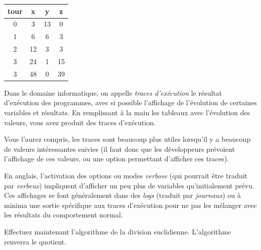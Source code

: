 \documentclass[11pt,a4paper]{article}
\begin{document}
\bigskip

    \begin{tabular}{|c|c|c|c|}
        \hline
        tour &  x &  y &  z  \\
        \hline
        0    &  3 & 13 &  0  \\
        1    &  6 &  6 &  3  \\
        2    & 12 &  3 &  3  \\
        3    & 24 &  1 & 15  \\
        3    & 48 &  0 & 39  \\
        \hline
    \end{tabular}

\bigskip


Dans le domaine informatique, on appelle \textit{traces d'exécution} le résultat d'exécution des programmes, avec si possible l'affichage de l'évolution de certaines variables et résultats.
En remplissant à la main les tableaux avec l'évolution des valeurs, vous avez produit des traces d'exécution.

Vous l'aurez compris, les traces sont beaucoup plus utiles lorsqu'il y a beaucoup de valeurs intéressantes suivies (il faut donc que les développeurs prévoient l'affichage de ces valeurs, ou une option permettant d'afficher ces traces).

En anglais, l'activation des options ou modes \textit{verbose} (qui pourrait être traduit par \textit{verbeux}) impliquent d'afficher un peu plus de variables qu'initialement prévu.
Ces affichages se font généralement dans des \textit{logs} (traduit par \textit{journaux}) ou à minima une sortie spécifique aux traces d'exécution pour ne pas les mélanger avec les résultats du comportement normal.


\vfillLast

\newpage

\vfillFirst


Effectuez maintenant l'algorithme de la division euclidienne.
L'algorithme renverra le quotient.


\bigskip
\end{document}
